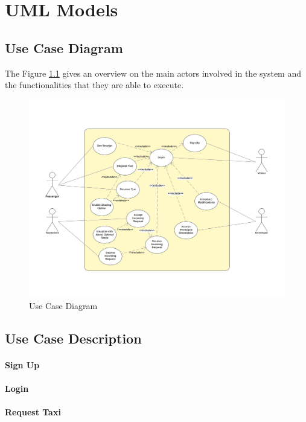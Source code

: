 \chapter{UML Models} \label{chap5}

\section{Use Case Diagram}
The Figure \ref{fig:usecase} gives an overview on the main actors involved in the system and the functionalities that they are able to execute.

\begin{figure}[htbp]
\centering
\includegraphics[width=\textwidth]{cpt/img/UseCase}
\caption{Use Case Diagram}
\label{fig:usecase}
\end{figure}

\section{Use Case Description}

\subsubsection{Sign Up}

\subsubsection{Login}

\subsubsection{Request Taxi}

